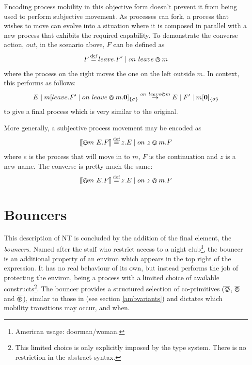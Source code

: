 Encoding process mobility in this objective form doesn't prevent it from
being used to perform subjective movement.  As processes can fork, a
process that wishes to move can evolve into a situation where it is
composed in parallel with a new process that exhibits the required
capability.  To demonstrate the converse action, $out$, in the scenario
above, $F$ can be defined as
\begin{equation}
F \operatorname{\stackrel{\textrm{def}}{=}} leave.F^\prime \;|\; on\ leave \varowedge m
\end{equation}
where the process on the right moves the one on the left outside $m$.
In context, this performs as follows:
\begin{equation}
E \;|\; {m}[ leave.F^\prime \;|\; on\ leave \varowedge m.\textbf{0} ]_{\{\sigma\}} 
\stackrel{on\ leave \varowedge m}{\rightarrow}
E \;|\; F^\prime \;|\; {m}[ \textbf{0} ]_{\{\sigma\}}
\end{equation}
to give a final process which is very similar to the original.

More generally, a subjective process movement may be encoded as
\begin{equation}
[\hspace{-0.3ex}[ \varovee m\ {E}.F ]\hspace{-0.3ex}] \operatorname{\stackrel{\textrm{def}}{=}} z.E \;|\; on\ z \varovee m.F
\end{equation}
where $e$ is the process that will move in to $m$, $F$ is
the continuation and $z$ is a new name.  The converse is pretty much the same:
\begin{equation}
[\hspace{-0.3ex}[ \varowedge m\ {E}.F ]\hspace{-0.3ex}] \operatorname{\stackrel{\textrm{def}}{=}} z.E \;|\; on\ z \varowedge m.F
\end{equation}

\section{Bouncers}
\label{bouncers}

This description of NT is concluded by the addition of the final
element, the \emph{bouncers}.  Named after the staff who restrict
access to a night club\footnote{American usage: doorman/woman.}, the
bouncer is an additional property of an environ which appears in the
top right of the expression.  It has no real behaviour of its own, but
instead performs the job of protecting the environ, being a process
with a limited choice of available constructs\footnote{This limited
  choice is only explicitly imposed by the type system.  There is no
  restriction in the abstract syntax.}.  The bouncer provides a
structured selection of co-primitives ($\overline{\varovee}$, $\overline{\varowedge}$ and $\overline{\varoast}$),
similar to those in \cite{sangiorgi:mobsafeambients} (see section
\ref{ambvariants}) and dictates which mobility transitions may occur,
and when.

